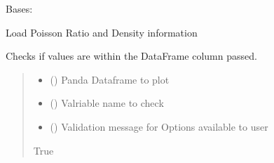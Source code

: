 \documentclass[letterpaper,10pt,english]{sphinxmanual}
\begin{document}
\begin{fulllineitems}
\label{\detokenize{pyrockmodulus:pyrockmodulus.pyrockmodulus.poisson_density}}
\pysigstartsignatures
{}
\pysigstopsignatures
\sphinxAtStartPar
Bases: 

\sphinxAtStartPar
Load Poisson Ratio and Density information

\begin{fulllineitems}
\label{\detokenize{pyrockmodulus:pyrockmodulus.pyrockmodulus.poisson_density.check_df_col_validity}}
\pysigstartsignatures
{}
\pysigstopsignatures
\sphinxAtStartPar
Checks if values are within the DataFrame column passed.
\begin{quote}\begin{description}
\begin{itemize}
\item {} 
\sphinxAtStartPar
{} () \textendash{} Panda Dataframe to plot

\item {} 
\sphinxAtStartPar
{} () \textendash{} Valriable name to check

\item {} 
\sphinxAtStartPar
{} () \textendash{} Validation message for Options available to user

\end{itemize}

\sphinxAtStartPar
True


\end{description}
\end{quote}
\end{fulllineitems}
\end{fulllineitems}
\end{document}
